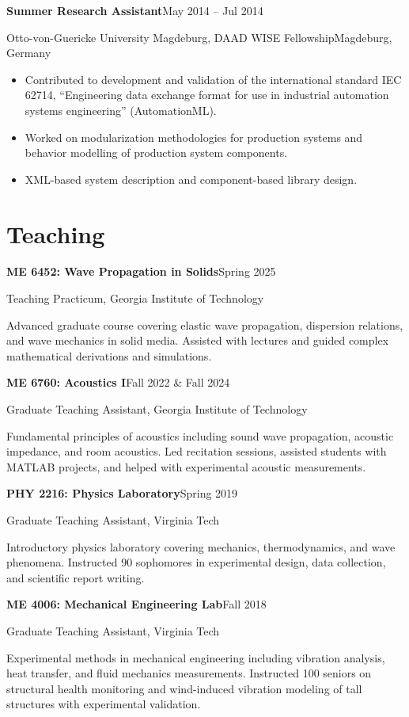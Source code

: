 \documentclass[10pt,letterpaper]{article}
\newcommand{\entry}[4]{%
  {\textbf{\color{navy}#1}\hfill{\color{muted}\small #2}\par}%
  {{\color{accent}#3}\hfill{\color{muted}\small #4}\par}\vspace{2pt}}
\newcommand{\detail}[1]{{\small #1}\par}
\newcommand{\gap}{\vspace{7pt}}
\begin{document}
\entry{Summer Research Assistant}{May 2014 -- Jul 2014}{Otto-von-Guericke University Magdeburg, DAAD WISE Fellowship}{Magdeburg, Germany}
\begin{itemize}
  \item Contributed to development and validation of the international standard IEC 62714, ``Engineering data exchange format for use in industrial automation systems engineering'' (AutomationML).
  \item Worked on modularization methodologies for production systems and behavior modelling of production system components.
  \item XML-based system description and component-based library design.
\end{itemize}

\section{Teaching}

\entry{ME 6452: Wave Propagation in Solids}{Spring 2025}{Teaching Practicum, Georgia Institute of Technology}{}
\detail{Advanced graduate course covering elastic wave propagation, dispersion relations, and wave mechanics in solid media. Assisted with lectures and guided complex mathematical derivations and simulations.}
\gap

\entry{ME 6760: Acoustics I}{Fall 2022 \& Fall 2024}{Graduate Teaching Assistant, Georgia Institute of Technology}{}
\detail{Fundamental principles of acoustics including sound wave propagation, acoustic impedance, and room acoustics. Led recitation sessions, assisted students with MATLAB projects, and helped with experimental acoustic measurements.}
\gap

\entry{PHY 2216: Physics Laboratory}{Spring 2019}{Graduate Teaching Assistant, Virginia Tech}{}
\detail{Introductory physics laboratory covering mechanics, thermodynamics, and wave phenomena. Instructed 90 sophomores in experimental design, data collection, and scientific report writing.}
\gap

\entry{ME 4006: Mechanical Engineering Lab}{Fall 2018}{Graduate Teaching Assistant, Virginia Tech}{}
\detail{Experimental methods in mechanical engineering including vibration analysis, heat transfer, and fluid mechanics measurements. Instructed 100 seniors on structural health monitoring and wind-induced vibration modeling of tall structures with experimental validation.}

\end{document}
